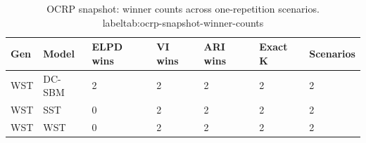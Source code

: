 \begin{table}[!h]
\centering
\caption{OCRP snapshot: winner counts across one-repetition scenarios.\\label{tab:ocrp-snapshot-winner-counts}}
\centering
\begin{tabular}[t]{lllllll}
\toprule
Gen & Model & ELPD wins & VI wins & ARI wins & Exact K & Scenarios\\
\midrule
WST & DC-SBM & 2 & 2 & 2 & 2 & 2\\
WST & SST & 0 & 2 & 2 & 2 & 2\\
WST & WST & 0 & 2 & 2 & 2 & 2\\
\bottomrule
\end{tabular}
\end{table}
